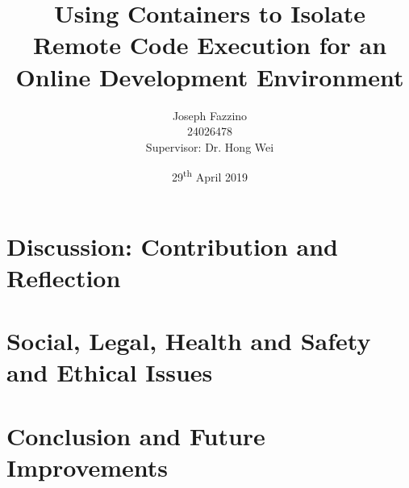 \documentclass[12pt, a4paper]{extreport}
\title{Using Containers to Isolate Remote Code Execution for an Online Development Environment}
\author{
    Joseph Fazzino\\
    24026478\\
    [4cm]{Supervisor: Dr. Hong Wei}
}
\date{29\textsuperscript{th} April 2019}
\begin{document}
\maketitle

\tableofcontents
\pagebreak



\pagebreak



\pagebreak



















\chapter{Discussion: Contribution and Reflection}
\pagebreak


\chapter{Social, Legal, Health and Safety and Ethical Issues}
\pagebreak


\chapter{Conclusion and Future Improvements}
\pagebreak


\printbibliography
\pagebreak



% 
\end{document}
